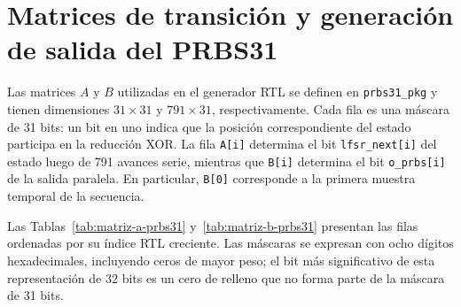 \documentclass[10pt,a4paper]{article}
\begin{document}
\section{Matrices de transición y generación de salida del PRBS31}
\label{anexo:matrices-prbs31}

Las matrices $A$ y $B$ utilizadas en el generador RTL se definen en
\texttt{prbs31\_pkg} y tienen dimensiones $31\times31$ y $791\times31$,
respectivamente. Cada fila es una máscara de 31 bits: un bit en uno indica
que la posición correspondiente del estado participa en la reducción XOR.
La fila \texttt{A[i]} determina el bit \texttt{lfsr\_next[i]} del estado
luego de 791 avances serie, mientras que \texttt{B[i]} determina el bit
\texttt{o\_prbs[i]} de la salida paralela. En particular, \texttt{B[0]}
corresponde a la primera muestra temporal de la secuencia.

Las Tablas~\ref{tab:matriz-a-prbs31} y~\ref{tab:matriz-b-prbs31} presentan
las filas ordenadas por su índice RTL creciente. Las máscaras se expresan
con ocho dígitos hexadecimales, incluyendo ceros de mayor peso; el bit
más significativo de esta representación de 32 bits es un cero de relleno
que no forma parte de la máscara de 31 bits.
\end{document}
